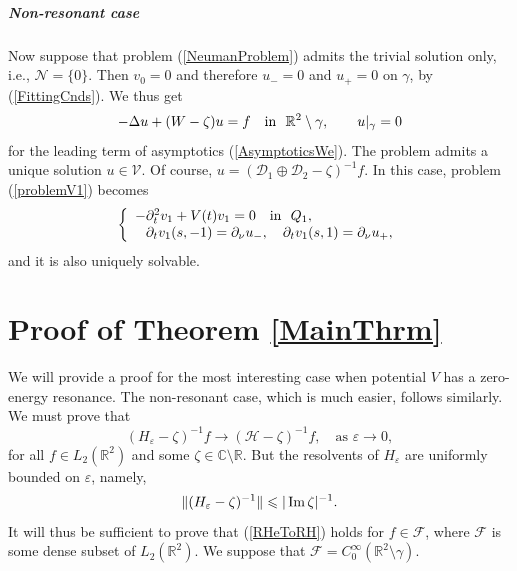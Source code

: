 \documentclass[graybox]{svmult}
\renewcommand{\Im}{\mathop{\rm Im}}
\newcommand{\Real}{\mathbb R}
\newcommand{\Cmpl}{\mathbb C}
\newcommand{\eps}{\varepsilon}
\newcommand{\cF}{\mathcal{F}}
\renewcommand{\leq}{\leqslant}
\newcommand{\eqref}[1]{(\ref{#1})}
\newcommand{\pte}{\partial_t}
\begin{document}
\subparagraph{Non-resonant case}
Now suppose that problem \eqref{NeumanProblem} admits the trivial solution only, i.e.,  $\mathcal{N}=\{0\}$.  Then $v_0=0$ and therefore $u_-=0$ and $u_+=0$ on $\gamma$, by \eqref{FittingCnds}. We thus get
$$
-\Delta u+(W-\zeta)u=f \quad \hbox{in \ } \Real^2\setminus \gamma,\qquad
 u|_{\gamma}=0
$$
for the leading term of asymptotics \eqref{AsymptoticsWe}.
The problem admits a unique solution $u\in \mathcal{V}$. Of course,
$u=(\mathcal{D}_1\oplus\mathcal{D}_2-\zeta)^{-1}f$.
In this case, problem \eqref{problemV1} becomes
\begin{equation}\label{problemV1Non}
\left\{
  \begin{array}{ll}
    -\pte^2 v_1+V(t)v_1=0\quad \hbox{in \ } Q_1, \\
    \phantom{-}\partial_t v_1(s, -1)=\partial_\nu u_-, \quad
\partial_t v_1(s, 1)=\partial_\nu u_+,
  \end{array}
\right.
\end{equation}
and it is also uniquely solvable.









\section{Proof of Theorem \ref{MainThrm}}
\label{Sec:Proof}

We will provide a proof for the most interesting case when potential $V$ has a zero-energy resonance. The non-resonant case, which
is much easier, follows similarly. We must prove that
\begin{equation}\label{RHeToRH}
 (H_\eps-\zeta)^{-1}f\to (\mathcal{H}-\zeta)^{-1}f,\quad \mbox{as } \eps\to 0,
\end{equation}
for all $f\in L_2(\Real^2)$ and some $\zeta\in \Cmpl\setminus\Real$.
But the resolvents of $H_\eps$ are uniformly bounded on $\eps$, namely,
$$
     \|(H_\eps-\zeta)^{-1}\|\leq |\Im \zeta|^{-1}.
$$
It will thus be sufficient to prove that  \eqref{RHeToRH} holds for
$f\in \cF$, where $\cF$ is some dense subset of $L_2(\Real^2)$. We suppose that $\cF=C^\infty_0(\Real^2\setminus\gamma)$.
\end{document}
